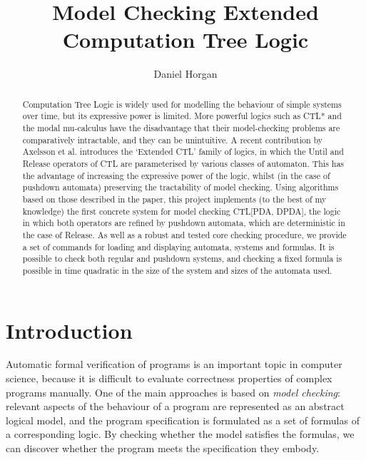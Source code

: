 \documentclass[11pt]{article}
\theoremstyle{definition}
\begin{document}
\title{Model Checking Extended Computation Tree Logic}
\author{Daniel Horgan}
\maketitle

\begin{abstract}

Computation Tree Logic is widely used for modelling the behaviour of simple
systems over time, but its expressive power is limited.  More powerful logics
such as CTL* and the modal mu-calculus have the disadvantage that their
model-checking problems are comparatively intractable, and they can be
unintuitive.  A recent contribution by Axelsson et al. introduces the `Extended
CTL' family of logics, in which the Until and Release operators of CTL are
parameterised by various classes of automaton. This has the advantage of
increasing the expressive power of the logic, whilst (in the case of pushdown
automata) preserving the tractability of model checking. 
Using algorithms based on those described in the paper, this project implements
(to the best of my knowledge) the first concrete system for model checking
CTL[PDA, DPDA], the logic in which both operators are refined by pushdown
automata, which are deterministic in the case of Release. 
As well as a robust and tested core checking procedure, we provide a set of
commands for loading and displaying automata, systems and formulas. It is
possible to check both regular and pushdown systems, and checking a fixed
formula is possible in time quadratic in the size of the system and sizes of
the automata used.


\end{abstract}

\newpage

\tableofcontents
\setcounter{tocdepth}{3}

\newpage

\section{Introduction}

Automatic formal verification of programs is an important topic in computer
science, because it is difficult to evaluate correctness properties of complex
programs manually. One of the main approaches is based on \textit{model
checking}: relevant aspects of the behaviour of a program are represented as an
abstract logical model, and the program specification is formulated as a set of
formulas of a corresponding logic. By checking whether the model satisfies the
formulas, we can discover whether the program meets the specification they
embody.
\end{document}

